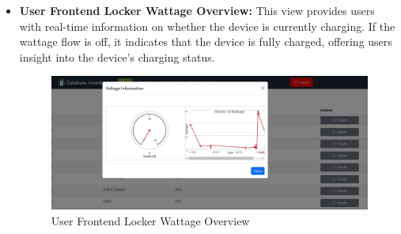 \begin{itemize}
\item \textbf{User Frontend Locker Wattage Overview:} This view provides users with real-time information on whether the device is currently charging. If the wattage flow is off, it indicates that the device is fully charged, offering users insight into the device's charging status.
\begin{figure}[h]
    \centering
    \includegraphics[width=1\linewidth]{images/user_wattage.JPG}
    \caption{User Frontend Locker Wattage Overview}
    \label{fig:locker-wattage-overview}
\end{figure}
\end{itemize}

